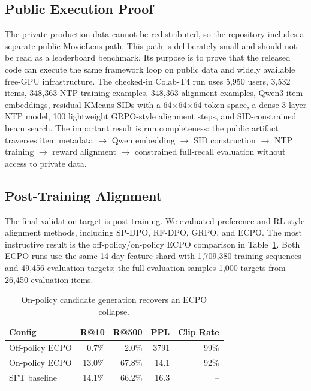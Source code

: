 \documentclass[11pt]{article}
\begin{document}
\subsection{Public Execution Proof}

The private production data cannot be redistributed, so the repository includes a separate public MovieLens path. This path is deliberately small and should not be read as a leaderboard benchmark. Its purpose is to prove that the released code can execute the same framework loop on public data and widely available free-GPU infrastructure. The checked-in Colab-T4 run uses 5,950 users, 3,532 items, 348,363 NTP training examples, 348,363 alignment examples, Qwen3 item embeddings, residual KMeans SIDs with a 64$\times$64$\times$64 token space, a dense 3-layer NTP model, 100 lightweight GRPO-style alignment steps, and SID-constrained beam search. The important result is run completeness: the public artifact traverses item metadata $\rightarrow$ Qwen embedding $\rightarrow$ SID construction $\rightarrow$ NTP training $\rightarrow$ reward alignment $\rightarrow$ constrained full-recall evaluation without access to private data.

\subsection{Post-Training Alignment}

The final validation target is post-training. We evaluated preference and RL-style alignment methods, including SP-DPO, RF-DPO, GRPO, and ECPO. The most instructive result is the off-policy/on-policy ECPO comparison in Table~\ref{tab:alignment}. Both ECPO runs use the same 14-day feature shard with 1,709,380 training sequences and 49,456 evaluation targets; the full evaluation samples 1,000 targets from 26,450 evaluation items.

\begin{table}[t]
\centering
\caption{On-policy candidate generation recovers an ECPO collapse.}
\label{tab:alignment}
\begin{tabular}{lrrrr}
\toprule
Config & R@10 & R@500 & PPL & Clip Rate \\
\midrule
Off-policy ECPO & 0.7\% & 2.0\% & 3791 & 99\% \\
On-policy ECPO & 13.0\% & 67.8\% & 14.1 & 92\% \\
SFT baseline & 14.1\% & 66.2\% & 16.3 & -- \\
\bottomrule
\end{tabular}
\end{table}
\end{document}
